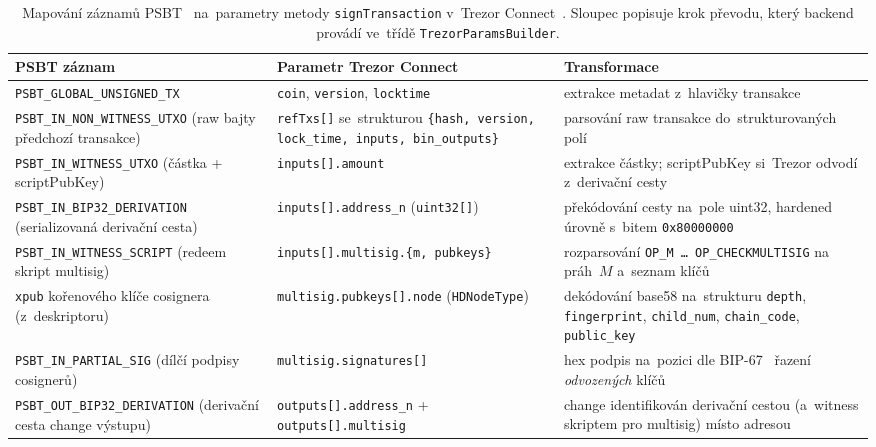 \begin{table}[htbp]
\centering
\caption[Mapování záznamů PSBT na parametry signTransaction]{Mapování
záznamů PSBT~\cite{BIP174} na~parametry metody \texttt{signTransaction}
v~Trezor Connect~\cite{TrezorConnect}. Sloupec 
popisuje krok převodu, který backend provádí ve~třídě
\texttt{TrezorParamsBuilder}.}
\label{tab:psbt-trezor-mapping}
\footnotesize
\begin{tabular}{|p{4.4cm}|p{3.8cm}|p{4.6cm}|}
\hline
\textbf{PSBT záznam} & \textbf{Parametr Trezor Connect} & \textbf{Transformace} \\
\hline
\texttt{PSBT\_\allowbreak GLOBAL\_\allowbreak UNSIGNED\_\allowbreak TX}
& \texttt{coin}, \texttt{version}, \texttt{locktime}
& extrakce metadat z~hlavičky transakce \\
\hline
\texttt{PSBT\_\allowbreak IN\_\allowbreak NON\_\allowbreak WITNESS\_\allowbreak UTXO}
(raw bajty předchozí transakce)
& \texttt{refTxs[]} se~strukturou \texttt{\{hash, version, lock\_time, inputs, bin\_outputs\}}
& parsování raw transakce do~strukturovaných polí \\
\hline
\texttt{PSBT\_\allowbreak IN\_\allowbreak WITNESS\_\allowbreak UTXO}
(částka + scriptPubKey)
& \texttt{inputs[].\allowbreak amount}
& extrakce částky; scriptPubKey si~Trezor odvodí z~derivační cesty \\
\hline
\texttt{PSBT\_\allowbreak IN\_\allowbreak BIP32\_\allowbreak DERIVATION}
(serializovaná derivační cesta)
& \texttt{inputs[].\allowbreak address\_n} (\texttt{uint32[]})
& překódování cesty na~pole uint32, hardened úrovně s~bitem \texttt{0x80000000} \\
\hline
\texttt{PSBT\_\allowbreak IN\_\allowbreak WITNESS\_\allowbreak SCRIPT}
(redeem skript multisig)
& \texttt{inputs[].\allowbreak multisig.\{m, pubkeys\}}
& rozparsování \texttt{OP\_M~\ldots~OP\_\allowbreak CHECKMULTISIG} na práh~$M$ a~seznam klíčů \\
\hline
\texttt{xpub} kořenového klíče cosignera (z~deskriptoru)
& \texttt{multisig.\allowbreak pubkeys[].\allowbreak node} (\texttt{HDNodeType})
& dekódování base58 na~strukturu \texttt{depth}, \texttt{fingerprint}, \texttt{child\_num}, \texttt{chain\_code}, \texttt{public\_key} \\
\hline
\texttt{PSBT\_\allowbreak IN\_\allowbreak PARTIAL\_\allowbreak SIG}
(dílčí podpisy cosignerů)
& \texttt{multisig.\allowbreak signatures[]}
& hex podpis na~pozici dle BIP-67~\cite{BIP67} řazení \emph{odvozených} klíčů \\
\hline
\texttt{PSBT\_\allowbreak OUT\_\allowbreak BIP32\_\allowbreak DERIVATION}
(derivační cesta change výstupu)
& \texttt{outputs[].\allowbreak address\_n} + \texttt{outputs[].\allowbreak multisig}
& change identifikován derivační cestou (a~witness skriptem pro multisig) místo adresou \\
\hline
\end{tabular}
\normalsize
\end{table}

